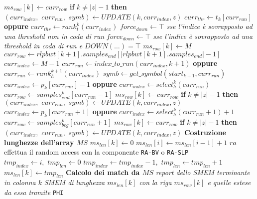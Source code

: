 \begin{algorithm}
\begin{algorithmic}[1]
    \State $ms_{row}[k]\gets curr_{row}$
    \State \hspace{-1.1mm}\textbf{if} $k\neq |z|-1$ \textbf{then}
    $(curr_{index},\,\,curr_{run},\,\,symb)\gets UPDATE(k, curr_{index},z)$ 
    \Else
    \State  $curr_{thr}\gets t_k[curr_{run}]$ \textbf{oppure}
    $curr_{thr}\gets rank_t^k(curr_{index})$ 
    \State $force_{down} \gets \top$\textit{ sse l'indice è sovrapposto ad una
    threshold non in coda di run}
     \State $force_{down} \gets \top$\textit{ sse l'indice è sovrapposto ad una
    threshold in coda di run e $DOWN(\ldots)=\top$}
    \State $ms_{row}[k]\gets M$
    \State $curr_{row}\gets
    rlpbwt[k+1].samples_{end}[|rlpbwt[k+1].samples_{end}|-1]$
    \State $curr_{index}\gets M-1$
    \State $curr_{run}\gets index\_to\_run(curr_{index},k+1)$ \textbf{oppure}
    $curr_{run}\gets rank_h^{k+1}(curr_{index})$
    \State $symb\gets get\_symbol(start_{k+1}, curr_{run})$
    \EndIf
    \State $curr_{index}\gets p_k[curr_{run}]-1$ \textbf{oppure}
    $curr_{index}\gets select_h^{k}(curr_{run})$
    \State $curr_{row}\gets samples_{end}^k[curr_{run}-1]$
    \State $ms_{row}[k]\gets curr_{row}$
    \State \textbf{if} $k\neq |z|-1$ \textbf{then}
    $(curr_{index},\,\,curr_{run},\,\,symb)\gets UPDATE(k, curr_{index},z)$ 
    \Else
    \State $curr_{index}\gets  p_k[curr_{run}+1]$ \textbf{oppure}
    $curr_{index}\gets select_h^{k}(curr_{run}+1)+1$
    \State $curr_{row}\gets samples_{beg}^k[curr_{run}+1]$
    \State $ms_{row}[k]\gets curr_{row}$
    \State \textbf{if} $k\neq |z|-1$ \textbf{then} $(curr_{index},\,\,curr_{run},
    \,\,symb)\gets UPDATE(k, curr_{index}, z)$ 
    \EndIf
    \EndIf
    \EndFor
    \For {\textit{every} $k\in[0,|z|)$}
    \Comment \textbf{Costruzione lunghezze dell'array $MS$}
    \State $ms_{len}[k]\gets 0$
    \State $ms_{len}[i]\gets ms_{len}[i-1]+1$
    \Else
    \Comment $ra$ effettua il random access con la componente \texttt{RA-BV} o
    \texttt{RA-SLP} 
    \State $tmp_{index}\gets i,\,\,tmp_{len}\gets 0$
    \State $tmp_{index}\gets tmp_{index}-1,\,\,tmp_{len}\gets tmp_{len}+1$
    \EndWhile
    \State $ms_{len}[k]\gets tmp_{len}$
    \EndIf
    \EndFor
    \For {\textit{every} $k\in[0,|z|)$}
    \Comment \textbf{Calcolo dei match da $MS$}
    \State \textit{report dello SMEM terminante in colonna $k$}
    \State \textit{SMEM di lunghezza $ms_{len}[k]$ con la riga $ms_{row}[k]$ e
    quelle estese da essa tramite} \texttt{PHI}
    \EndIf
    \EndFor
    \EndFunction


\end{algorithmic}
\end{algorithm}
